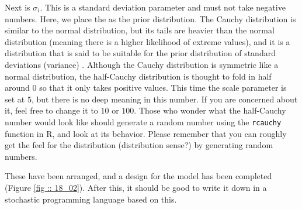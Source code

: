 \documentclass{ltjsbook}
\begin{document}
Next is $\sigma_i$. This is a standard deviation parameter and must not take negative numbers. Here, we place the  as the prior distribution. The Cauchy distribution is similar to the normal distribution, but its tails are heavier than the normal distribution (meaning there is a higher likelihood of extreme values), and it is a distribution that is said to be suitable for the prior distribution of standard deviations (variance) \parencite{gelman2006prior}. Although the Cauchy distribution is symmetric like a normal distribution, the half-Cauchy distribution is thought to fold in half around 0 so that it only takes positive values. This time the scale parameter is set at $5$, but there is no deep meaning in this number. If you are concerned about it, feel free to change it to $10$ or $100$. Those who wonder what the half-Cauchy number would look like should generate a random number using the \texttt{rcauchy} function in R, and look at its behavior. Please remember that you can roughly get the feel for the distribution (distribution sense?) by generating random numbers.


These have been arranged, and a design for the model has been completed (Figure \ref{fig :: 18_02}). After this, it should be good to write it down in a stochastic programming language based on this.

\end{document}

